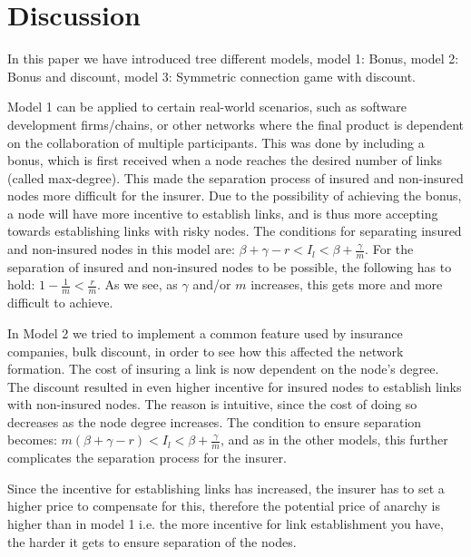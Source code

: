 \section{Discussion}
In this paper we have introduced tree different models, model 1: Bonus, model 2: Bonus and discount, model 3: Symmetric connection game with discount.

Model 1 can be applied to certain real-world scenarios, such as software development firms/chains, or other networks where the final product is dependent on the collaboration of multiple participants.
This was done by including a bonus, which is first received when a node reaches the desired number of links (called max-degree). This made the separation process of insured and non-insured nodes more difficult for the insurer. Due to the possibility of achieving the bonus, a node will have more incentive to establish links, and is thus more accepting towards establishing links with risky nodes. The conditions for separating insured and non-insured nodes in this model are: $\beta+\gamma-r<I_{l}<\beta+\frac{\gamma}{m}$. For the separation of insured and non-insured nodes to be possible, the following has to hold: $1-\frac{1}{m}<\frac{r}{m}$. As we see, as $\gamma$ and/or $m$ increases, this gets more and more difficult to achieve. 

In Model 2 we tried to implement a common feature used by insurance companies, bulk discount, in order to see how this affected the network formation. The cost of insuring a link is now dependent on the node's degree. 
The discount resulted in even higher incentive for insured nodes to establish links with non-insured nodes. The reason is intuitive, since the cost of doing so decreases as the node degree increases. 
The condition to ensure separation becomes: $m(\beta+\gamma-r)<I_{l}<\beta+\frac{\gamma}{m}$, and as in the other models, this further complicates the separation process for the insurer. 

Since the incentive for establishing links has increased, the insurer has to set a higher price to compensate for this, therefore the potential price of anarchy is higher than in model 1 i.e. the more incentive for link establishment you have, the harder it gets to ensure separation of the nodes.  


